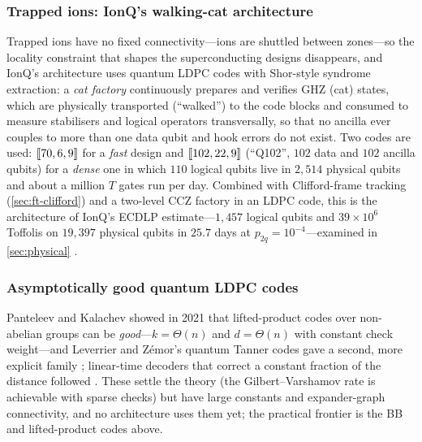 \subsubsection{Trapped ions: IonQ's walking-cat architecture}\label{sec:ionq-arch}
Trapped ions have no fixed connectivity---ions are shuttled between zones---so the locality constraint that shapes the superconducting designs disappears, and IonQ's architecture \cite{walkingcat26} uses quantum LDPC codes with Shor-style syndrome extraction: a \emph{cat factory} continuously prepares and verifies GHZ (cat) states, which are physically transported (``walked'') to the code blocks and consumed to measure stabilisers and logical operators transversally, so that no ancilla ever couples to more than one data qubit and hook errors do not exist. Two codes are used: $[\![70,6,9]\!]$ for a \emph{fast} design and $[\![102,22,9]\!]$ (``Q102'', $102$ data and $102$ ancilla qubits) for a \emph{dense} one in which $110$ logical qubits live in $2{,}514$ physical qubits and about a million $T$ gates run per day. Combined with Clifford-frame tracking (\cref{sec:ft-clifford}) and a two-level CCZ factory in an LDPC code, this is the architecture of IonQ's ECDLP estimate---$1{,}457$ logical qubits and $39\times10^6$ Toffolis on $19{,}397$ physical qubits in $25.7$ days at $p_{2q}=10^{-4}$---examined in \cref{sec:physical} \cite{haener26}.

\subsubsection{Asymptotically good quantum LDPC codes}
Panteleev and Kalachev showed in 2021 that lifted-product codes over non-abelian groups can be \emph{good}---$k=\Theta(n)$ and $d=\Theta(n)$ with constant check weight---and Leverrier and Z\'emor's quantum Tanner codes gave a second, more explicit family \cite{panteleev-kalachev21good,leverrier-zemor22}; linear-time decoders that correct a constant fraction of the distance followed \cite{leverrier-zemor22dec,gu22}. These settle the theory (the Gilbert--Varshamov rate is achievable with sparse checks) but have large constants and expander-graph connectivity, and no architecture uses them yet; the practical frontier is the BB and lifted-product codes above.

